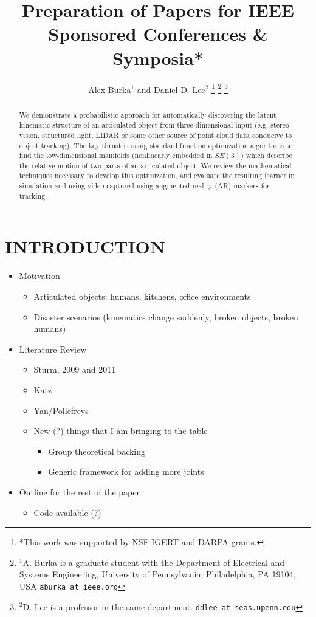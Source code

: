 \documentclass[letterpaper, 10 pt, conference]{ieeeconf}  %
\title{\LARGE \bf
Preparation of Papers for IEEE Sponsored Conferences \& Symposia*
}
\author{Alex Burka$^{1}$ and Daniel D. Lee$^{2}$%
\thanks{*This work was supported by NSF IGERT and DARPA grants.}%
\thanks{$^{1}$A. Burka is a graduate student with the Department of Electrical and Systems Engineering, University of Pennsylvania, Philadelphia, PA 19104, USA
        {\tt\small aburka at ieee.org}}%
\thanks{$^{2}$D. Lee is a professor in the same department.
        {\tt\small ddlee at seas.upenn.edu}}%
}
\begin{document}
\maketitle
\thispagestyle{empty}
\pagestyle{empty}


\begin{abstract}

  We demonstrate a probabilistic approach for automatically discovering the latent kinematic structure of an articulated object from three-dimensional input (e.g. stereo vision, structured light, LIDAR or some other source of point cloud data conducive to object tracking).  The key thrust is using standard function optimization algorithms to find the low-dimensional manifolds (nonlinearly embedded in $SE(3)$) which describe the relative motion of two parts of an articulated object. We review the mathematical techniques necessary to develop this optimization, and evaluate the resulting learner in simulation and using video captured using augmented reality (AR) markers for tracking.

\end{abstract}


\section{INTRODUCTION}

\begin{itemize}
    \item Motivation
      \begin{itemize}
        \item Articulated objects: humans, kitchens, office environments
        \item Disaster scenarios (kinematics change suddenly, broken objects, broken humans)
      \end{itemize}
    \item Literature Review
      \begin{itemize}
        \item Sturm, 2009 and 2011 \cite{Sturm2009} \cite{Sturm2011}
        \item Katz \cite{Katz2012}
        \item Yan/Pollefreys \cite{Yan2006}
        \item New (?) things that I am bringing to the table
          \begin{itemize}
            \item Group theoretical backing
            \item Generic framework for adding more joints
          \end{itemize}
      \end{itemize}
    \item Outline for the rest of the paper
      \begin{itemize}
        \item Code available (?)
      \end{itemize}
\end{itemize}
\end{document}
